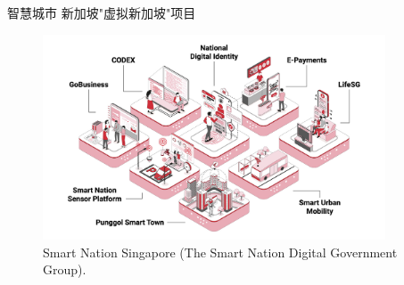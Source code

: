 \begin{frame}{智慧城市}
	新加坡"虚拟新加坡"项目
\begin{figure}[h!]
\centering
     \includegraphics[height=2.4in, width=4.0in, viewport=0 0 1920 1154,clip]{Figures/Smart-city_strategic_national_projects.jpg}
\caption{\tiny \textrm{Smart Nation Singapore (The Smart Nation Digital Government Group).}}%
\label{Fig:Smart-city_strategic_national_projects}
\end{figure}

\end{frame}

